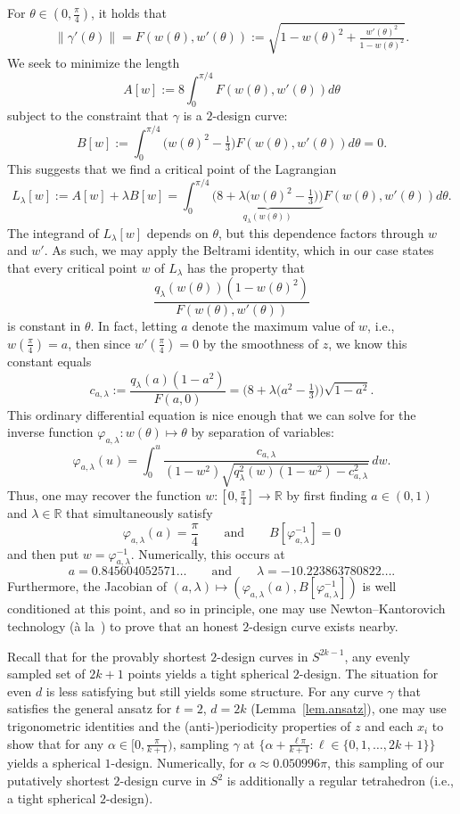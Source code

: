 \documentclass[12pt]{article}
\theoremstyle{plain}
\theoremstyle{definition}
\theoremstyle{remark}
\begin{document}
For $\theta\in(0,\frac{\pi}{4})$, it holds that
\[
\|\gamma'(\theta)\|
=F(w(\theta),w'(\theta))
:=\sqrt{1-w(\theta)^2+\tfrac{w'(\theta)^2}{1-w(\theta)^2}}.
\]
We seek to minimize the length
\[
A[w]
:=8\int_0^{\pi/4}F(w(\theta),w'(\theta))d\theta
\]
subject to the constraint that $\gamma$ is a $2$-design curve:
\[
B[w]
:=\int_0^{\pi/4}\big(w(\theta)^2-\tfrac{1}{3}\big)F(w(\theta),w'(\theta))d\theta
=0.
\]
This suggests that we find a critical point of the Lagrangian
\[
L_\lambda[w]
:=A[w]+\lambda B[w]
=\int_0^{\pi/4}\underbrace{\Big(8+\lambda \big(w(\theta)^2-\tfrac{1}{3}\big)\Big)}_{q_\lambda(w(\theta))}F(w(\theta),w'(\theta))d\theta.
\]
The integrand of $L_\lambda[w]$ depends on $\theta$, but this dependence factors through $w$ and $w'$.
As such, we may apply the Beltrami identity, which in our case states that every critical point $w$ of $L_\lambda$ has the property that
\[
\frac{q_\lambda(w(\theta))(1-w(\theta)^2)}{F(w(\theta),w'(\theta))}
\]
is constant in $\theta$.
In fact, letting $a$ denote the maximum value of $w$, i.e., $w(\frac{\pi}{4})=a$, then since $w'(\frac{\pi}{4})=0$ by the smoothness of $z$, we know this constant equals
\[
c_{a,\lambda}
:=\frac{q_\lambda(a)(1-a^2)}{F(a,0)}
=\Big(8+\lambda\big(a^2-\tfrac{1}{3}\big)\Big)\sqrt{1-a^2}.
\]
This ordinary differential equation is nice enough that we can solve for the inverse function $\varphi_{a,\lambda}\colon w(\theta)\mapsto \theta$ by separation of variables:
\[
\varphi_{a,\lambda}(u)=\int_0^u\frac{c_{a,\lambda}}{(1-w^2)\sqrt{q_\lambda^2(w)(1-w^2)-c_{a,\lambda}^2}}\,dw.
\]
Thus, one may recover the function $w\colon[0,\frac{\pi}{4}]\to\mathbb{R}$ by first finding $a\in(0,1)$ and $\lambda\in\mathbb{R}$ that simultaneously satisfy 
\[
\varphi_{a,\lambda}(a)=\frac{\pi}{4}
\qquad\text{and}\qquad B[\varphi_{a,\lambda}^{-1}]=0
\]
and then put $w=\varphi_{a,\lambda}^{-1}$.
Numerically, this occurs at
\[
a=0.845604052571\ldots
\qquad\text{and}\qquad
\lambda=-10.223863780822\ldots.
\]
Furthermore, the Jacobian of $(a,\lambda)\mapsto(\varphi_{a,\lambda}(a),B[\varphi_{a,\lambda}^{-1}])$ is well conditioned at this point, and so in principle, one may use Newton--Kantorovich technology (\`{a} la~\cite{CohnKM:16}) to prove that an honest $2$-design curve exists nearby.

Recall that for the provably shortest $2$-design curves in $S^{2k-1}$, any evenly sampled set of $2k+1$ points yields a tight spherical $2$-design.
The situation for even $d$ is less satisfying but still yields some structure.
For any curve $\gamma$ that satisfies the general ansatz for $t=2$, $d=2k$ (Lemma~\ref{lem.ansatz}), one may use trigonometric identities and the (anti-)periodicity properties of $z$ and each $x_i$ to show that for any $\alpha \in [0,\frac{\pi}{k+1})$, sampling $\gamma$ at $\{\alpha + \frac{\ell \pi}{k+1} : \ell \in\{0, 1, \ldots, 2k+1\}\}$ yields a spherical $1$-design.  Numerically, for $\alpha \approx 0.050996 \pi$, this sampling of our putatively shortest $2$-design curve in $S^2$ is additionally a regular tetrahedron (i.e., a tight spherical $2$-design).
\end{document}
